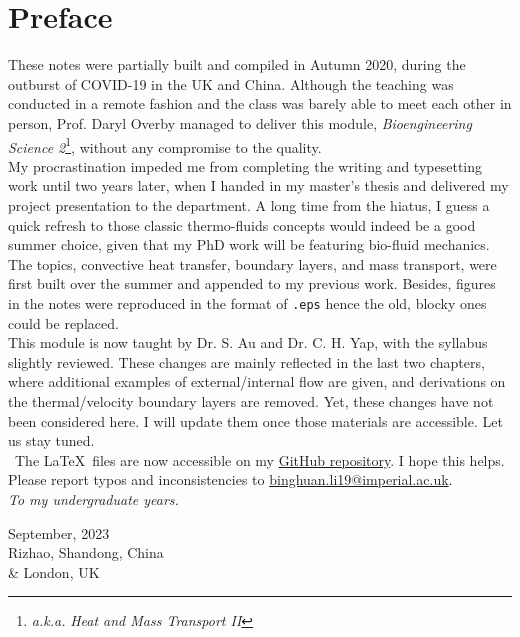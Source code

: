\documentclass[12pt, a4paper]{article}
\begin{document}
\section*{Preface}
\begin{spacing}{1.15}
These notes were partially built and compiled in Autumn 2020, during the outburst of COVID-19 in the UK and China. Although the teaching was conducted in a remote fashion and the class was barely able to meet each other in person, Prof. Daryl Overby managed to deliver this module, \textit{Bioengineering Science 2}\footnote{\textit{a.k.a.} \textit{Heat and Mass Transport II}}, without any compromise to the quality.\\

My procrastination impeded me from completing the writing and typesetting work until two years later, when I handed in my master's thesis and delivered my project presentation to the department. A long time from the hiatus, I guess a quick refresh to those classic thermo-fluids concepts would indeed be a good summer choice, given that my PhD work will be featuring bio-fluid mechanics.\\

The topics, convective heat transfer, boundary layers, and mass transport, were first built over the summer and appended to my previous work. Besides, figures in the notes were reproduced in the format of \texttt{.eps} hence the old, blocky ones could be replaced.\\ 

This module is now taught by Dr. S. Au and Dr. C. H. Yap, with the syllabus slightly reviewed. These changes are mainly reflected in the last two chapters, where additional examples of external/internal flow are given, and derivations on the thermal/velocity boundary layers are removed. Yet, these changes have not been considered here. I will update them once those materials are accessible. Let us stay tuned.\\

\faGithub \ The \LaTeX \ files are now accessible on my \href{https://github.com/binghuan-li/Notes-and-Formula-Sheets}{GitHub repository}. I hope this helps. Please report typos and inconsistencies to \href{mailto:binghuan.li19@imperial.ac.uk}{binghuan.li19@imperial.ac.uk}.\\

\textit{To my undergraduate years.}
\begin{flushright}
    September, 2023\\
    Rizhao, Shandong, China\\
    \& London, UK
\end{flushright}
\end{spacing}
\newpage
\tableofcontents
\newpage
\end{document}
